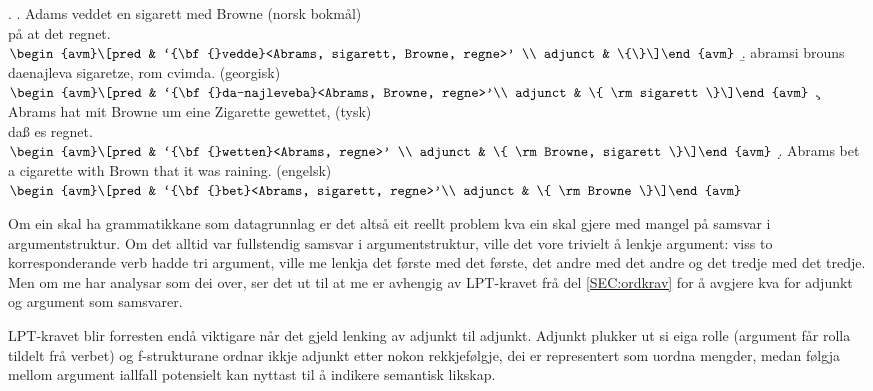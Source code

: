 \documentclass[12pt,a4paper,oneside,draft]{report}
\begin{document}
{\avmoptions{}
\ex. \label{ex:vedde}
\a. Adams veddet en sigarett med Browne \hfill{} (norsk bokmål)\\ på at det regnet.\\
    $\\\begin{avm}\[pred & `{\bf{}vedde}<Abrams, sigarett, Browne, regne>' \\
                 adjunct & \{\}\]\end{avm}\\$
\b. abramsi brouns daenajleva sigaretze, rom cvimda. \hfill{} (georgisk)\\
    $\\\begin{avm}\[pred &  `{\bf{}da-najleveba}<Abrams, Browne, regne>'\\
    adjunct &  \{ \rm sigarett \}\]\end{avm}\\$ 
\c. Abrams hat mit Browne um eine Zigarette gewettet, \hfill{} (tysk)\\
    daß es regnet.\\
    $\\\begin{avm}\[pred & `{\bf{}wetten}<Abrams, regne>' \\
                  adjunct & \{ \rm Browne, sigarett \}\]\end{avm}\\$
\d. Abrams bet a cigarette with Brown that it was raining. \hfill{} (engelsk)\\
    $\\\begin{avm}\[pred & `{\bf{}bet}<Abrams, sigarett, regne>'\\
                  adjunct & \{ \rm Browne \}\]\end{avm}$

}

Om ein skal ha grammatikkane som datagrunnlag er det altså eit reellt
problem kva ein skal gjere med mangel på samsvar i
argumentstruktur. Om det alltid var fullstendig samsvar i
argumentstruktur, ville det vore trivielt å lenkje argument: viss to
korresponderande verb hadde tri argument, ville me lenkja det første
med det første, det andre med det andre og det tredje med det
tredje. Men om me har analysar som dei over, ser det ut til at me er
avhengig av LPT-kravet frå del \ref{SEC:ordkrav} for å avgjere kva for
adjunkt og argument som samsvarer. 

LPT-kravet blir forresten endå viktigare når det gjeld lenking av
adjunkt til adjunkt. Adjunkt plukker ut si eiga rolle (argument får
rolla tildelt frå verbet) og f\hyp{}strukturane ordnar ikkje adjunkt etter
nokon rekkjefølgje, dei er representert som uordna mengder, medan
følgja mellom argument iallfall potensielt kan nyttast til å indikere
semantisk likskap.
\end{document}
